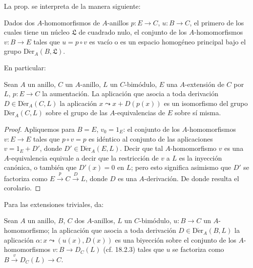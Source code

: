 La prop.  se interpreta de la manera siguiente:

\begin{corollary}[20.1.3]
\label{0.20.1.3-fr}
Dados dos $A$-homomorfismos de $A$-anillos $p:E\to C$,
$u:B\to C$, el primero de los cuales tiene un núcleo $\mathfrak{L}$ de cuadrado
nulo, el conjunto de los $A$-homomorfismos $v:B\to E$ tales que $u=p\circ v$
es vacío o es un espacio homogéneo principal bajo el grupo
$\operatorname{D\acute{e}r}_A(B,\mathfrak{L})$.
\end{corollary}

En particular:

\begin{corollary}[20.1.4]
\label{0.20.1.4-fr}
Sean $A$ un anillo, $C$ un $A$-anillo, $L$ un $C$-bimódulo, $E$ una
$A$-extensión de $C$ por $L$, $p:E\to C$ la aumentación. La aplicación que
asocia a toda derivación $D\in\operatorname{D\acute{e}r}_A(C,L)$ la aplicación
$x\leadsto x+D(p(x))$ es un isomorfismo del grupo
$\operatorname{D\acute{e}r}_A(C,L)$ sobre el grupo de las $A$-equivalencias de $E$
sobre sí misma.
\end{corollary}

\begin{proof}
Apliquemos  para $B=E$, $v_0=1_E$: el conjunto
de los $A$-homomorfismos $v:E\to E$ tales que $p\circ v=p$ es idéntico al
conjunto de las aplicaciones $v=1_E+D'$, donde
$D'\in\operatorname{D\acute{e}r}_A(E,L)$. Decir que tal $A$-homomorfismo $v$ es
una $A$-equivalencia equivale a decir que la restricción de $v$ a $L$ es la
inyección canónica, o también que $D'(x)=0$ en $L$; pero esto significa asimismo
que $D'$ se factoriza como $E\xrightarrow{p}C\xrightarrow{D}L$, donde $D$ es una
$A$-derivación. De donde resulta el corolario.
\end{proof}

Para las extensiones triviales,  da:

\begin{corollary}[20.1.5]
\label{0.20.1.5-fr}
Sean $A$ un anillo, $B$, $C$ dos $A$-anillos, $L$ un $C$-bimódulo,
$u:B\to C$ un $A$-homomorfismo; la aplicación que asocia a toda derivación
$D\in\operatorname{D\acute{e}r}_A(B,L)$ la aplicación
$\alpha:x\leadsto(u(x),D(x))$ es una biyección sobre el conjunto de los
$A$-homomorfismos $v:B\to D_C(L)$ \textup{(cf. 18.2.3)} tales que $u$ se factoriza como
$B\xrightarrow{v}D_C(L)\to C$.
\end{corollary}

